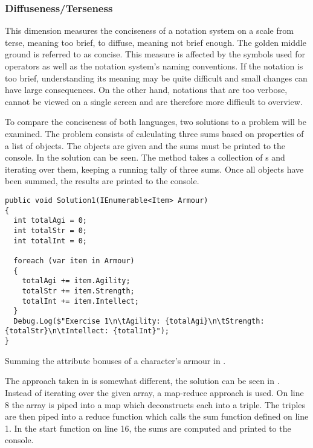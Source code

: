 \subsubsection{Diffuseness/Terseness} %
This dimension measures the conciseness of a notation system on a scale from terse, meaning too brief, to diffuse, meaning not brief enough. The golden middle ground is referred to as concise. This measure is affected by the symbols used for operators as well as the notation system's naming conventions. If the notation is too brief, understanding its meaning may be quite difficult and small changes can have large consequences. On the other hand, notations that are too verbose, cannot be viewed on a single screen and are therefore more difficult to overview.

To compare the conciseness of both languages, two solutions to a problem will be examined. The problem consists of calculating three sums based on properties of a list of objects. The objects are given and the sums must be printed to the console. In  the \cs solution can be seen. The method takes a collection of s and iterating over them, keeping a running tally of three sums. Once all objects have been summed, the results are printed to the console.

\begin{listing}[H]
\begin{verbatim}
public void Solution1(IEnumerable<Item> Armour)
{
  int totalAgi = 0;
  int totalStr = 0;
  int totalInt = 0;

  foreach (var item in Armour)
  {
    totalAgi += item.Agility;
    totalStr += item.Strength;
    totalInt += item.Intellect;
  }
  Debug.Log($"Exercise 1\n\tAgility: {totalAgi}\n\tStrength: {totalStr}\n\tIntellect: {totalInt}");
}
\end{verbatim}
\caption{Summing the attribute bonuses of a character's armour in \cs.}
\label{lst:cs-armour}
\end{listing}

The approach taken in \fs is somewhat different, the solution can be seen in . Instead of iterating over the given array, a map-reduce approach is used. On line 8 the array is piped into a map which deconstructs each  into a triple. The triples are then piped into a reduce function which calls the sum function defined on line 1. In the start function on line 16, the sums are computed and printed to the console.


